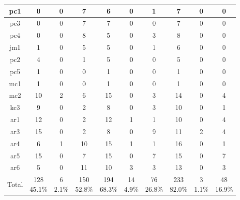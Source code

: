 \begin{table}[!t]
\begin{tabular}{|@{}c@{}||@{}c@{}|@{}c@{}|@{}c@{}||@{}c@{}|@{}c@{}|@{}c@{}||@{}c@{}|@{}c@{}|@{}c@{}|}
pc1 &0      &0      &7      &6      &0      &1      &7      &0      &0\\ \hline
pc3 &0      &0      &7      &7      &0      &0      &7      &0      &0\\ \hline
pc4 &0      &0      &8      &5      &0      &3      &8      &0      &0\\ \hline
jm1 &1      &0      &5      &5      &0      &1      &6      &0      &0\\ \hline
pc2 &4      &0      &1      &5      &0      &0      &5      &0      &0\\ \hline
pc5 &1      &0      &0      &1      &0      &0      &1      &0      &0\\ \hline
mc1 &1      &0      &0      &1      &0      &0      &1      &0      &0\\ \hline
mc2 &10     &2      &6      &15     &0      &3      &14     &0      &4\\ \hline
kc3 &9      &0      &2      &8      &0      &3      &10     &0      &1\\ \hline
ar1 &12     &0      &2      &12     &1      &1      &10     &0      &4\\ \hline
ar3 &15     &0      &2      &8      &0      &9      &11     &2      &4\\ \hline
ar4 &6      &1      &10     &15     &1      &1      &16     &0      &1\\ \hline
ar5 &15     &0      &7      &15     &0      &7      &15     &0      &7\\ \hline
ar6 &5      &0      &11     &10     &3      &3      &13     &0      &3\\ \hline
Total       &\specialcell{{128}\\{45.1\%}}  &\specialcell{{6}\\{2.1\%}}     &\specialcell{{150}\\{52.8\%}}  &\specialcell{{194}\\{68.3\%}}  &\specialcell{{14}\\{4.9\%}}    &\specialcell{{76}\\{26.8\%}}   &\specialcell{{233}\\{82.0\%}}  &\specialcell{{3}\\{1.1\%}}     &\specialcell{{48}\\{16.9\%}}\\ \hline

\end{tabular}
\end{table}


